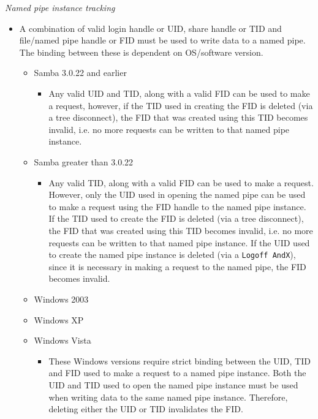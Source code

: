 \documentclass[english]{report}
\begin{document}
\textit{Named pipe instance tracking}

\begin{itemize}

\item[] A combination of valid login handle or UID, share handle or TID and
file/named pipe handle or FID must be used to write data to a named pipe.  The
binding between these is dependent on OS/software version.

\begin{itemize}

\item[] Samba 3.0.22 and earlier

\begin{itemize}

\item[] Any valid UID and TID, along with a valid FID can be used to make a
request, however, if the TID used in creating the FID is deleted (via a tree
disconnect), the FID that was created using this TID becomes invalid, i.e. no
more requests can be written to that named pipe instance.

\end{itemize}

\item[] Samba greater than 3.0.22

\begin{itemize}

\item[] Any valid TID, along with a valid FID can be used to make a request.
However, only the UID used in opening the named pipe can be used to make a
request using the FID handle to the named pipe instance. If the TID used to
create the FID is deleted (via a tree disconnect), the FID that was created
using this TID becomes invalid, i.e. no more requests can be written to that
named pipe instance. If the UID used to create the named pipe instance is
deleted (via a \texttt{Logoff AndX}), since it is necessary in making a request
to the named pipe, the FID becomes invalid.

\end{itemize}

\item[] Windows 2003
\item[] Windows XP
\item[] Windows Vista

\begin{itemize}

\item[] These Windows versions require strict binding between the UID, TID and
FID used to make a request to a named pipe instance. Both the UID and TID used
to open the named pipe instance must be used when writing data to the same
named pipe instance. Therefore, deleting either the UID or TID invalidates the
FID.


\end{itemize}
\end{itemize}
\end{itemize}
\end{document}
